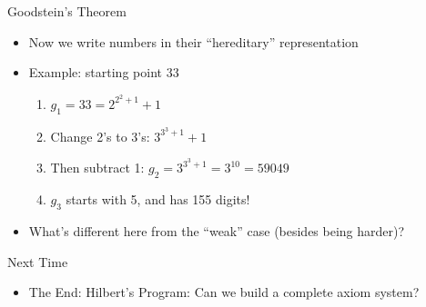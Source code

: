 \documentclass{beamer}
\begin{document}
\begin{frame}{Goodstein's Theorem}
\begin{itemize}
\item Now we write numbers in their ``hereditary'' representation
\item Example: starting point 33
\begin{enumerate}
\item $g_1 = 33 = 2^{2^2+1} + 1$
\item Change 2's to 3's: $3^{3^3+1} + 1$
\item Then subtract 1: $g_2 = 3^{3^3+1} = 3^10 = 59049$
\item $g_3$ starts with 5, and has 155 digits!
\end{enumerate}
\item What's different here from the ``weak'' case (besides being harder)?
\end{itemize}
\end{frame}

\begin{frame}{Next Time}
\begin{itemize}
\item The End: Hilbert's Program: Can we build a complete axiom system? 
\end{itemize}
\end{frame}
\end{document}

